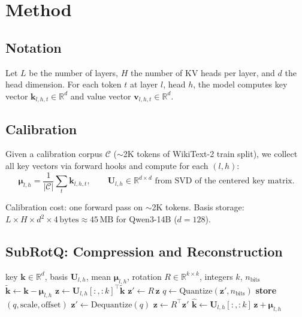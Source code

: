 \documentclass{article}
\begin{document}
\section{Method}
\label{sec:method}

\subsection{Notation}
Let $L$ be the number of layers, $H$ the number of KV heads per layer, and $d$
the head dimension. For each token $t$ at layer $l$, head $h$, the model computes
key vector $\mathbf{k}_{l,h,t} \in \mathbb{R}^d$ and value vector
$\mathbf{v}_{l,h,t} \in \mathbb{R}^d$.

\subsection{Calibration}
Given a calibration corpus $\mathcal{C}$ ($\sim$2K tokens of WikiText-2 train
split), we collect all key vectors via forward hooks and compute for each $(l, h)$:
\begin{equation}
  \boldsymbol{\mu}_{l,h} = \frac{1}{|\mathcal{C}|}\sum_t \mathbf{k}_{l,h,t},
  \qquad
  \mathbf{U}_{l,h} \in \mathbb{R}^{d\times d}
  \text{ from SVD of the centered key matrix.}
\end{equation}

Calibration cost: one forward pass on $\sim$2K tokens. Basis storage:
$L \times H \times d^2 \times 4\,\text{bytes} \approx 45\,\text{MB}$ for
Qwen3-14B ($d=128$).

\subsection{SubRotQ: Compression and Reconstruction}

\begin{algorithm}[t]
  \caption{SubRotQ --- Compress / Reconstruct}
  \label{alg:compress}
  \begin{algorithmic}[1]
    \Require key $\mathbf{k} \in \mathbb{R}^d$, basis
      $\mathbf{U}_{l,h}$, mean $\boldsymbol{\mu}_{l,h}$,
      rotation $R\in\mathbb{R}^{k\times k}$, integers $k$, $n_\text{bits}$
    \State $\tilde{\mathbf{k}} \gets \mathbf{k} - \boldsymbol{\mu}_{l,h}$
    \State $\mathbf{z} \gets \mathbf{U}_{l,h}[:, {:}k]^\top \tilde{\mathbf{k}}$
    \State $\mathbf{z}' \gets R\,\mathbf{z}$
    \State $q \gets \mathrm{Quantize}(\mathbf{z}', n_\text{bits})$
    \State \textbf{store} $(q, \text{scale}, \text{offset})$
    \Statex
    \State $\mathbf{z}' \gets \mathrm{Dequantize}(q)$
    \State $\mathbf{z} \gets R^\top \mathbf{z}'$
    \State $\hat{\mathbf{k}} \gets \mathbf{U}_{l,h}[:, {:}k]\,\mathbf{z}
           + \boldsymbol{\mu}_{l,h}$
  \end{algorithmic}
\end{algorithm}
\end{document}
